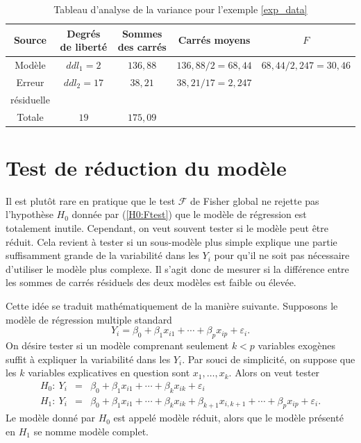 \begin{table}[htb!]
\caption{Tableau d'analyse de la variance pour l'exemple \ref{exp_data}}
\label{tab:exanova}
\centering
\begin{footnotesize}
\renewcommand{\arraystretch}{1.6}
\begin{tabular}{ccccc}\hline
Source & Degrés de liberté & Sommes des carrés & Carrés moyens & $F$ \\ \hline
Modèle & $ddl_1=2$ &
$136,88$ & $136,88/2=68,44$ & $68,44/2,247=30,46$\\
Erreur & $ddl_2=17$ & $38,21$ & $38,21/17=2,247$ & \\
résiduelle & & & \\
\hline Totale & $19$ & $175,09$ & &
\end{tabular}
\end{footnotesize}
\end{table}

\section{Test de réduction du modèle}

Il est plut\^ot rare en pratique que le test $\mathcal F$ de Fisher global ne
rejette pas l'hypoth\`ese $H_0$ donnée par (\ref{H0:Ftest})
que le modèle de régression est
totalement inutile. Cependant, on veut souvent tester si
le modèle peut être réduit. Cela revient à tester
si un sous-modèle plus simple explique une partie suffisamment
grande de la variabilité dans les $Y_i$ pour qu'il ne soit pas
nécessaire d'utiliser le modèle plus complexe. Il s'agit donc de mesurer si
la différence entre les sommes de carrés résiduels des
deux modèles est faible ou élevée.


Cette idée se traduit mathématiquement de la manière suivante. Supposons le modèle de régression
multiple standard
$$Y_i=\beta_0+\beta_1x_{i1}+\cdots+\beta_{p}x_{ip}+\varepsilon_i.$$
On désire tester si un modèle comprenant seulement $k<p$ variables exogènes
suffit à expliquer la variabilité dans les $Y_i$. Par souci de simplicité, on suppose que les $k$ variables explicatives en question sont $x_1,\ldots,x_k$. Alors on veut tester
\begin{eqnarray}
H_0:~Y_i&=&\beta_0+\beta_1x_{i1}+\cdots+\beta_kx_{ik}+\varepsilon_i\label{H0:ESS}\\
H_1:~Y_i&=&\beta_0+\beta_1x_{i1}+\cdots+\beta_kx_{ik}+\beta_{k+1}x_{i,k+1}+\cdots+\beta_{p}x_{ip}
+\varepsilon_i.\nonumber
\end{eqnarray}
Le mod\`ele donné par $H_0$ est appelé mod\`ele réduit, alors que le modèle présenté
en $H_1$ se nomme mod\`ele complet.

